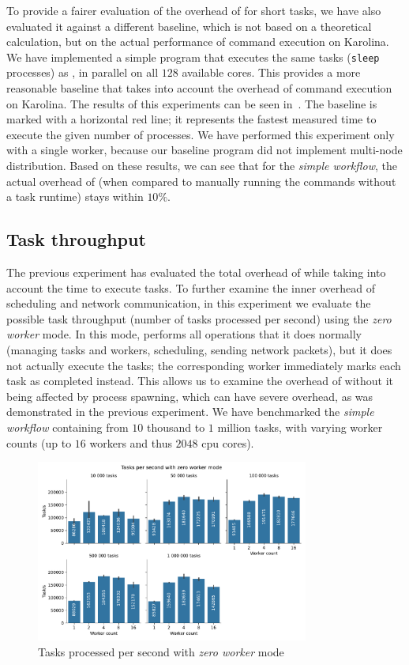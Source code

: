 To provide a fairer evaluation of the overhead of \hyperqueue{} for short tasks, we have
also evaluated it against a different baseline, which is not based on a theoretical calculation,
but on the actual performance of command execution on Karolina. We have implemented a simple
program that executes the same tasks (\texttt{sleep} processes) as
\hyperqueue{}, in parallel on all $128$ available cores. This provides a
more reasonable baseline that takes into account the overhead of command execution on Karolina. The
results of this experiments can be seen in~. The baseline is marked with a
horizontal red line; it represents the fastest measured time to execute the given number of
processes. We have performed this experiment only with a single worker, because our baseline
program did not implement multi-node distribution. Based on these results, we can see that for the
\emph{simple workflow}, the actual overhead of \hyperqueue{} (when compared to manually
running the commands without a task runtime) stays within
$10\%$.

\subsection{Task throughput}
\label{sec:hq-exp-task-throughput}
The previous experiment has evaluated the total overhead of \hyperqueue{} while taking
into account the time to execute tasks. To further examine the inner overhead of scheduling and
network communication, in this experiment we evaluate the possible task throughput (number of tasks
processed per second) using the \emph{zero worker} mode. In this mode, \hq{}
performs all operations that it does normally (managing tasks and workers, scheduling, sending
network packets), but it does not actually execute the tasks; the corresponding worker immediately
marks each task as completed instead. This allows us to examine the overhead of
\hyperqueue{} without it being affected by process spawning, which can have severe
overhead, as was demonstrated in the previous experiment. We have benchmarked the
\emph{simple workflow} containing from $10$ thousand to $1$
million tasks, with varying worker counts (up to $16$ workers and thus
$2048$ \gls{cpu} cores).

\begin{figure}[h]
	\centering
	\includegraphics[width=0.8\textwidth]{imgs/hq/charts/task-per-s}
	\caption{Tasks processed per second with \emph{zero worker} mode}
	\label{fig:hq-tasks-per-s}
\end{figure}

